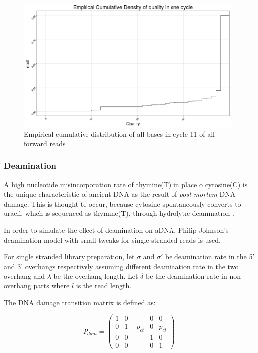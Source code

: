 \documentclass[11pt,a4paper]{report}
\begin{document}
\begin{figure}[H]
\centering
\includegraphics[width=11cm]{pictures/Rplot_ecdf.png}
\caption{Empirical cumulative distribution of all bases in cycle 11 of all forward 
reads}
\label{CDF}
\end{figure}


\subsubsection{Deamination} \label{Deamination}

A high nucleotide misincorporation rate of thymine(T) in place o
cytosine(C) is the unique characteristic of ancient DNA as the result of
\emph{post-mortem} DNA damage.  This is thought to occur, because
cytosine spontaneously converts to uracil, which is sequenced as
thymine(T), through hydrolytic deamination
\cite{mapdamage2}\cite{damagepattern}.

In order to simulate the effect of deamination on aDNA, 
Philip Johnson's deamination model\cite{mapdamage2}  
with small tweaks for single-stranded reads is used.

For single stranded library preparation,
let $\sigma$ and $\sigma'$ be deamination rate in the 5' 
and 3' overhangs respectively assuming different deamination rate 
in the two overhang and $\lambda$ be the overhang length. 
Let  $\delta$ be the deamination rate in non-overhang parts 
where $l$ is the read length.


The DNA damage transition matrix is defined as:

$$ P_{dam} = 
 \begin{pmatrix}
  1 & 0 & 0 & 0 \\
  0 & 1-p_{ct} & 0 & p_{ct} \\
  0  & 0  & 1 & 0  \\
  0 & 0 & 0 & 1 
 \end{pmatrix}$$
 
\end{document}
